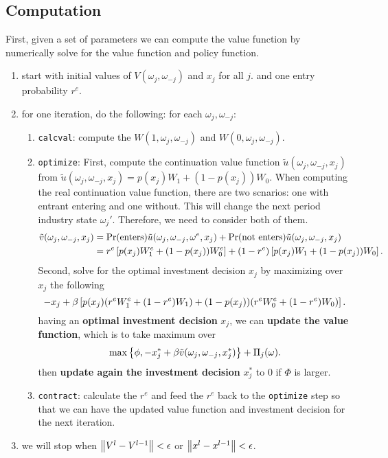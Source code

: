 \documentclass[12pt]{article}[margin=1in]
\begin{document}
\subsection{Computation}
First, given a set of parameters we can compute the value function by numerically solve for the value function and policy function.
\begin{enumerate}
    \item start with initial values of $V(\omega_j, \omega_{-j})$ and $x_j$ for all $j$. and one entry probability $r^e$.
    \item for one iteration, do the following:
    for each $\omega_j, \omega_{-j}$:
    \begin{enumerate}
        \item \verb|calcval|: compute the $W(1, \omega_j,\omega_{-j})$ and $W(0, \omega_j,\omega_{-j})$.
        \item  \verb|optimize|: First, compute the continuation value function $\tilde{u}(\omega_j, \omega_{-j}, x_j)$ from $\tilde{u}(\omega_j, \omega_{-j}, x_j)= p(x_j)W_1+(1-p(x_j))W_0$. When computing the real continuation value function, there are two scnarios: one with entrant entering and one without. This will change the next period industry state $\omega_j'$. Therefore, we need to consider both of them.
        \begin{equation*}
            \begin{split}
                \tilde{v}(\omega_j, \omega_{-j}, x_j)&=\Pr(\text{enters})\tilde{u}(\omega_j, \omega_{-j}, \omega^e, x_j)
                +\Pr(\text{not enters})\tilde{u}(\omega_j, \omega_{-j}, x_j)\\
                & = r^e\left[p(x_j)W_1^e+(1-p(x_j))W_0^e\right]+(1-r^e)\left[p(x_j)W_1+(1-p(x_j))W_0\right].
            \end{split}
        \end{equation*}
        Second, solve for the optimal investment decision $x_j$ by maximizing over $x_j$ the following
        \begin{equation*}
            -x_j + \beta\left[p(x_j)(r^eW^e_1+(1-r^e)W_1)+(1-p(x_j))(r^eW_0^e+(1-r^e)W_0)\right].
        \end{equation*}
        having an \textbf{optimal investment decision} $x_j$, we can \textbf{update the value function}, which is to take maximum over 
        \begin{equation*}
            \max\left\{\phi, -x_j^*+\beta\tilde{v}(\omega_j, \omega_{-j}, x_j^*)\right\}+\Pi_j(\omega).
        \end{equation*}
        then \textbf{update again the investment decision} $x_j^*$ to $0$ if $\Phi$ is larger.
        \item \verb|contract|: calculate the $r^e$ and feed the $r^e$ back to the \verb|optimize| step so that we can have the updated value function and investment decision for the next iteration.
    \end{enumerate}
    \item we will stop when $\left\| V^{l}-V^{l-1} \right\|<\epsilon$ or $\left\| x^{l}-x^{l-1} \right\|<\epsilon$.
\end{enumerate}
\end{document}
